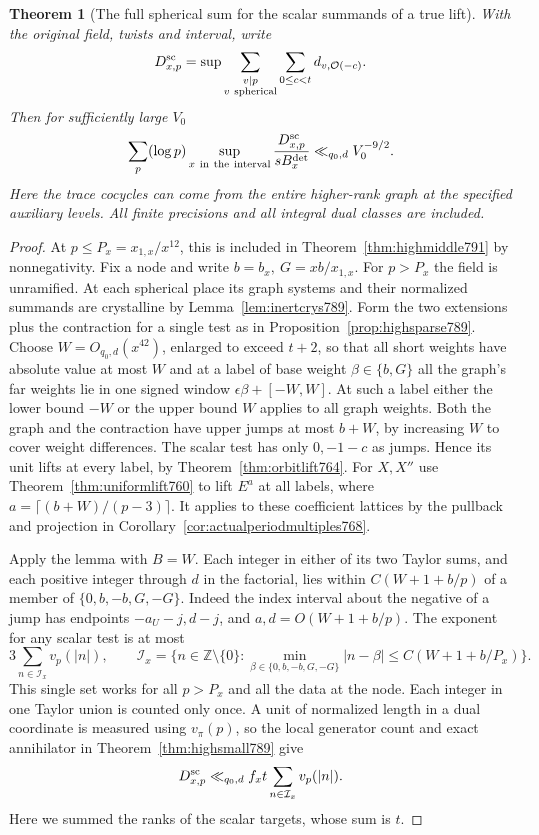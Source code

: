 \documentclass[a4paper,11pt]{article}
\newtheorem{theorem}[proposition]{Theorem}
\theoremstyle{definition}
\theoremstyle{remark}
\newcommand{\ZZ}{\mathbb Z}\newcommand{\ord}{\operatorname{ord}}
\numberwithin{equation}{section}
\begin{document}
\begin{theorem}[The full spherical sum for the scalar summands of a true lift]
\leavevmode\label{thm:highscalars793}
With the original field, twists and interval, write
\[
 D^{\rm sc}_{x,p}
   =\sup\sum_{\substack{v\mid p\\v\ {\rm spherical}}}
               \sum_{0\le c<t}d_{v,\mathcal O(-c)} .
\]
Then for sufficiently large \(V_0\)
\[
     \sum_p(\log p)\sup_{x\ {\rm in\ the\ interval}}
          \frac{D^{\rm sc}_{x,p}}{s B_x^{\rm det}}
                 \ll_{q_0,d} V_0^{-9/2}.
\]
Here the trace cocycles can come from the entire higher-rank
graph at the specified auxiliary levels. All finite precisions
and all integral dual classes are included.
\end{theorem}
\begin{proof}
At \(p\le P_x=x_{1,x}/x^{12}\), this is included in
Theorem~\ref{thm:highmiddle791} by nonnegativity. Fix a
node and write \(b=b_x,\ G=xb/x_{1,x}\). For \(p>P_x\)
the field is unramified. At each spherical place its graph
systems and their normalized summands are crystalline by
Lemma~\ref{lem:inertcrys789}. Form the two extensions plus
the contraction for a single test as in
Proposition~\ref{prop:highsparse789}.
Choose \(W=O_{q_0,d}(x^{42})\), enlarged to exceed \(t+2\),
so that all short weights have absolute value at most \(W\)
and at a label of base weight \(\beta\in\{b,G\}\) all the
graph's far weights lie in one signed window
\(\epsilon\beta+[-W,W]\). At such a label either the
lower bound \(-W\) or the upper bound \(W\) applies to
all graph weights. Both the graph and the contraction
have upper jumps at most \(b+W\), by increasing \(W\)
to cover weight differences. The scalar test has only
\(0,-1-c\) as jumps. Hence its unit lifts at every label,
by Theorem~\ref{thm:orbitlift764}. For \(X,X''\) use
Theorem~\ref{thm:uniformlift760} to lift \(E^a\) at all
labels, where \(a=\lceil(b+W)/(p-3)\rceil\). It applies
to these coefficient lattices by the pullback and projection
in Corollary~\ref{cor:actualperiodmultiples768}.

Apply the lemma with \(B=W\). Each integer in either of
its two Taylor sums, and each positive integer through
\(d\) in the factorial, lies within \(C(W+1+b/p)\)
of a member of \(\{0,b,-b,G,-G\}\). Indeed the index
interval about the negative of a jump has endpoints
\(-a_U-j,d-j\), and \(a,d=O(W+1+b/p)\). The exponent
for any scalar test is at most
\[
         3\sum_{n\in\mathcal I_x}v_p(|n|),
 \qquad
 \mathcal I_x=\{n\in\ZZ\setminus\{0\}:
     \min_{\beta\in\{0,b,-b,G,-G\}}|n-\beta|
             \le C(W+1+b/P_x)\}.
\]
This single set works for all \(p>P_x\) and all the data
at the node. Each integer in one Taylor union is counted
only once. A unit of normalized length in a dual coordinate
is measured using \(v_\pi(p)\), so the local generator count
and exact annihilator in Theorem~\ref{thm:highsmall789} give
\[
       D^{\rm sc}_{x,p}\ll_{q_0,d}
             f_x t\sum_{n\in\mathcal I_x}v_p(|n|).
\]
Here we summed the ranks of the scalar targets, whose sum
is \(t\).


\end{proof}
\end{document}
